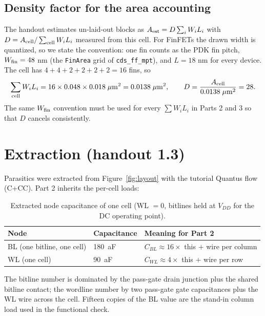 \documentclass[10pt,letterpaper]{article}
\newcommand{\densityD}{28}          %
\newcommand{\cBL}{180}              %
\newcommand{\cWL}{90}               %
\begin{document}
\subsection{Density factor for the area accounting}
The handout estimates un-laid-out blocks as $A_{\rm est}=D\sum_i W_iL_i$ with $D=A_{\rm cell}/\sum_{\rm cell}W_iL_i$ measured from this cell. For FinFETs the drawn width is quantized, so we state the convention: one fin counts as the PDK fin pitch, $W_{\rm fin}=48$ nm (the \texttt{FinArea} grid of \texttt{cds\_ff\_mpt}), and $L=18$ nm for every device. The cell has $4+4+2+2+2+2=16$ fins, so
\begin{equation}
\sum_{\rm cell}W_iL_i=16\times0.048\times0.018\;\mu\mathrm m^2=0.0138\;\mu\mathrm m^2,
\qquad
D=\frac{A_{\rm cell}}{0.0138\;\mu\mathrm m^2}=\densityD .
\label{eq:density}
\end{equation}
The same $W_{\rm fin}$ convention must be used for every $\sum W_iL_i$ in Parts 2 and 3 so that $D$ cancels consistently.

\section{Extraction (handout 1.3)}
Parasitics were extracted from Figure~\ref{fig:layout} with the tutorial Quantus flow (C+CC). Part 2 inherits the per-cell loads:
\begin{table}[H]\centering
\caption{Extracted node capacitance of one cell (WL $=0$, bitlines held at $V_{DD}$ for the DC operating point).}\label{tab:cap}
\begin{tabular}{@{}lll@{}}\toprule
Node & Capacitance & Meaning for Part 2 \\\midrule
BL (one bitline, one cell) & \cBL\ aF & $C_{BL}\approx 16\times$ this $+$ wire per column \\
WL (one cell) & \cWL\ aF & $C_{WL}\approx 4\times$ this $+$ wire per row \\\bottomrule
\end{tabular}
\end{table}
The bitline number is dominated by the pass-gate drain junction plus the shared bitline contact; the wordline number by two pass-gate gate capacitances plus the WL wire across the cell. Fifteen copies of the BL value are the stand-in column load used in the functional check.
\end{document}
